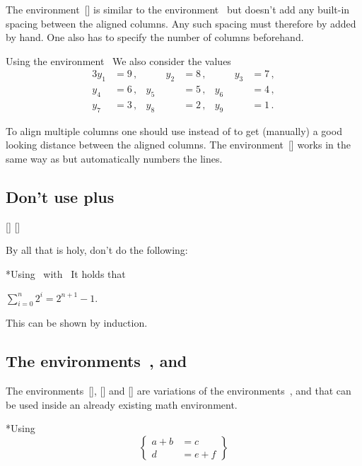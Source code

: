 The environment~[\envname] is similar to the environment~ but doesn’t add any built-in spacing between the aligned columns.
Any such spacing must therefore by added by hand.
One also has to specify the number of columns beforehand.
\begin{showlatex}{Using the environment~}
We also consider the values
\begin{alignat*}{3}
  y_1 &= 9 \,,  &\qquad   y_2 &= 8 \,,  &\qquad   y_3 &= 7 \,,  \\
  y_4 &= 6 \,,  &         y_5 &= 5 \,,  &         y_6 &= 4 \,,  \\
  y_7 &= 3 \,,  &         y_8 &= 2 \,,  &         y_9 &= 1 \,.
\end{alignat*}
\end{showlatex}
To align multiple columns one should use  instead of  to get (manually) a good looking distance between the aligned columns.
The environment~[\envname] works in the same way as  but automatically numbers the lines.



\subsection{Don’t use  plus \inlinecodetitle{\$ \$}}
[\envname]
\massindex{\$ \$}[\inlinecode]

By all that is holy, don’t do the following:
\begin{showlatex}*{Using~ with~\inlinecode{\$ \$}}
It holds that
\begin{center}
  $\sum_{i=0}^n 2^i = 2^{n+1} - 1$.
\end{center}
This can be shown by induction.
\end{showlatex}



\subsection{The environments~,  and }

The environments~[\envname], [\envname] and [\envname] are variations of the environments~,  and  that can be used inside an already existing math environment.
\begin{showlatex}*{Using }
\[
  \left\{
    \begin{aligned}
      a + b &= c      \\
      d     &= e + f
    \end{aligned}
  \right\}
\]
\end{showlatex}



